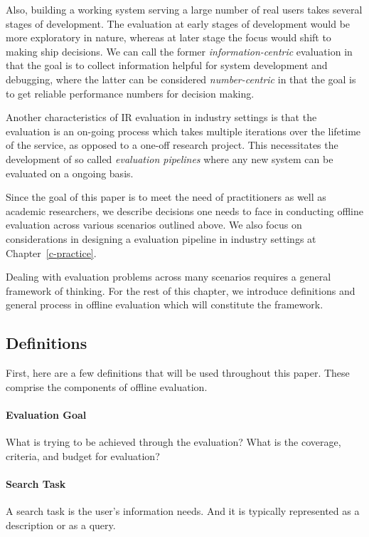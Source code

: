 Also, building a working system serving a large number of real users takes several stages of development. The evaluation at early stages of development would be more exploratory in nature, whereas at later stage the focus would shift to making ship decisions. We can call the former \textit{information-centric} evaluation in that the goal is to collect information helpful for system development and debugging, where the latter can be considered \textit{number-centric} in that the goal is to get reliable performance numbers for decision making.

Another characteristics of IR evaluation in industry settings is that the evaluation is an on-going process which takes multiple iterations over the lifetime of the service, as opposed to a one-off research project. This necessitates the development of so called \textit{evaluation pipelines} where any new system can be evaluated on a ongoing basis.

Since the goal of this paper is to meet the need of practitioners as well as academic researchers, we describe decisions one needs to face in conducting offline evaluation across various scenarios outlined above. We also focus on considerations in designing a evaluation pipeline in industry settings at Chapter~\ref{c-practice}.

Dealing with evaluation problems across many scenarios requires a general framework of thinking. For the rest of this chapter, we introduce definitions and general process in offline evaluation which will constitute the framework.

\subsection{Definitions}

First, here are a few definitions that will be used throughout this paper. These comprise the components of offline evaluation.

\paragraph{Evaluation Goal} What is trying to be achieved through the evaluation? What is the coverage, criteria, and budget for evaluation?

\paragraph{Search Task}  A search task is the user's information needs. And it is typically represented as a description or as a query.

